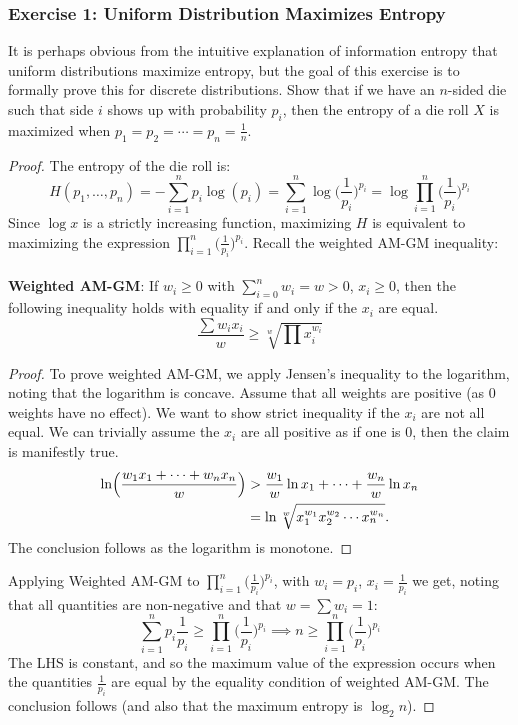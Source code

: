 \documentclass{article}
\begin{document}
\subsubsection{Exercise 1: Uniform Distribution Maximizes Entropy}
It is perhaps obvious from the intuitive explanation of information entropy that uniform distributions maximize entropy, but the goal of this exercise is to formally prove this for discrete distributions. Show that if we have an $n$-sided die such that side $i$ shows up with probability $p_i$, then the entropy of a die roll $X$ is maximized when $p_1 = p_2 = \cdots = p_n = \frac{1}{n}$. 
\begin{proof}
The entropy of the die roll is:
$$H(p_1, \ldots, p_n) = - \sum_{i=1}^n p_i \log{(p_i)} = \sum_{i=1}^n \log{\Big(\frac{1}{p_i}\Big)^{p_i}} = \log{\prod_{i=1}^n \Big(\frac{1}{p_i} \Big)^{p_i} }$$
Since $\log{x}$ is a strictly increasing function, maximizing $H$ is equivalent to maximizing the expression
$\prod_{i=1}^n \Big(\frac{1}{p_i} \Big)^{p_i} $. Recall the weighted AM-GM inequality:
\\\\
\textbf{Weighted AM-GM}: If $w_i \geq 0$ with $\sum_{i=0}^n w_i = w > 0$, $x_i\geq 0$, then the following inequality holds with equality if and only if the $x_i$ are equal. 
$$\frac{\sum w_i x_i}{w} \geq \sqrt[w]{\prod x_i^{w_i}}$$
\begin{proof}
To prove weighted AM-GM, we apply Jensen's inequality to the logarithm, noting that the logarithm is concave. Assume that all weights are positive (as 0 weights have no effect). We want to show strict inequality if the $x_i$ are not all equal. We can trivially assume the $x_i$ are all positive as if one is 0, then the claim is manifestly true. 
\begin{align*}
\ln\Bigl(\frac{w_1x_1+\cdots+w_nx_n}w\Bigr) & >\frac{w_1}w\ln x_1+\cdots+\frac{w_n}w\ln x_n \\
& =\ln \sqrt[w]{x_1^{w_1} x_2^{w_2} \cdots x_n^{w_n}}.
\end{align*}
The conclusion follows as the logarithm is monotone.
\end{proof}
Applying Weighted AM-GM to $\prod_{i=1}^n \Big(\frac{1}{p_i} \Big)^{p_i}$, with  $w_i= p_i$, $x_i = \frac{1}{p_i}$ we get, noting that all quantities are non-negative and that $w = \sum w_i = 1$:
$$\sum_{i=1}^n p_i \frac{1}{p_i} \geq \prod_{i=1}^n \Big(\frac{1}{p_i} \Big)^{p_i} \implies n \geq \prod_{i=1}^n \Big(\frac{1}{p_i} \Big)^{p_i}$$
The LHS is constant, and so the maximum value of the expression occurs when the quantities $\frac{1}{p_i}$ are equal by the equality condition of weighted AM-GM. The conclusion follows (and also that the maximum entropy is $\log_2{n}$). 
\end{proof} 
\end{document}
